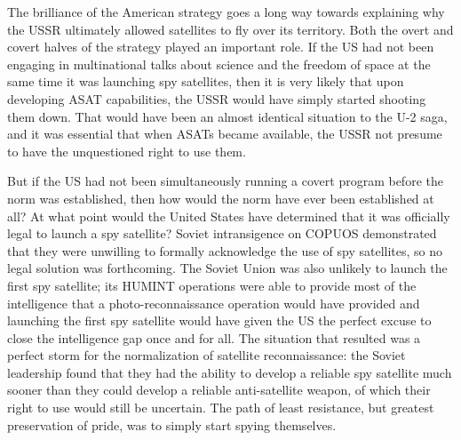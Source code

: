 \documentclass[11pt]{memoir}
\begin{document}
The brilliance of the American strategy goes a long way towards explaining why the USSR ultimately allowed satellites to fly over its territory. Both the overt and covert halves of the strategy played an important role. If the US had not been engaging in multinational talks about science and the freedom of space at the same time it was launching spy satellites, then it is very likely that upon developing ASAT capabilities, the USSR would have simply started shooting them down. That would have been an almost identical situation to the U-2 saga, and it was essential that when ASATs became available, the USSR not presume to have the unquestioned right to use them.

But if the US had not been simultaneously running a covert program before the norm was established, then how would the norm have ever been established at all? At what point would the United States have determined that it was officially legal to launch a spy satellite? Soviet intransigence on COPUOS demonstrated that they were unwilling to formally acknowledge the use of spy satellites, so no legal solution was forthcoming. The Soviet Union was also unlikely to launch the first spy satellite; its HUMINT operations were able to provide most of the intelligence that a photo-reconnaissance operation would have provided and launching the first spy satellite would have given the US the perfect excuse to close the intelligence gap once and for all. The situation that resulted was a perfect storm for the normalization of satellite reconnaissance: the Soviet leadership found that they had the ability to develop a reliable spy satellite much sooner than they could develop a reliable anti-satellite weapon, of which their right to use would still be uncertain. The path of least resistance, but greatest preservation of pride, was to simply start spying themselves.
\end{document}
